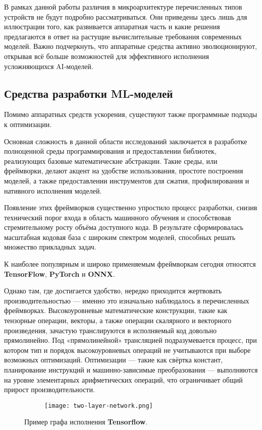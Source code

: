 В рамках данной работы различия в микроархитектуре перечисленных типов устройств не будут подробно рассматриваться.
Они приведены здесь лишь для иллюстрации того, как развивается аппаратная часть и какие решения предлагаются в ответ на растущие вычислительные требования современных моделей.
Важно подчеркнуть, что аппаратные средства активно эволюционируют, открывая всё больше возможностей для эффективного исполнения усложняющихся AI-моделей.

\subsection{Средства разработки ML-моделей}

Помимо аппаратных средств ускорения, существуют также программные подходы к оптимизации.

Основная сложность в данной области исследований заключается в разработке полноценной среды программирования и предоставлении библиотек, реализующих базовые математические абстракции.
Такие среды, или фреймворки, делают акцент на удобстве использования, простоте построения моделей, а также предоставлении инструментов для сжатия, профилирования и нативного исполнения моделей.

Появление этих фреймворков существенно упростило процесс разработки, снизив технический порог входа в область машинного обучения и способствовав стремительному росту объёма доступного кода.
В результате сформировалась масштабная кодовая база с широким спектром моделей, способных решать множество прикладных задач.

К наиболее популярным и широко применяемым фреймворкам сегодня относятся \textbf{TensorFlow}, \textbf{PyTorch} и \textbf{ONNX}.

Однако там, где достигается удобство, нередко приходится жертвовать производительностью — именно это изначально наблюдалось в перечисленных фреймворках.
Высокоуровневые математические конструкции, такие как тензорные операции, векторы, а также операции скалярного и векторного произведения, зачастую транслируются в исполняемый код довольно прямолинейно.
Под «прямолинейной» трансляцией подразумевается процесс, при котором тип и порядок высокоуровневых операций не учитываются при выборе возможных оптимизаций.
Оптимизации — такие как свёртка констант, планирование инструкций и машинно-зависимые преобразования — выполняются на уровне элементарных арифметических операций, что ограничивает общий прирост производительности.

\begin{figure}[h]
    \centering
    \begin{subfigure}{0.45\textwidth}
        \centering
        \texttt{[image: two-layer-network.png]}
        \label{fig:sub2}
    \end{subfigure}
    \caption{Пример графа исполнения \textbf{Tensorflow}.}
    \label{fig:main}
\end{figure}

